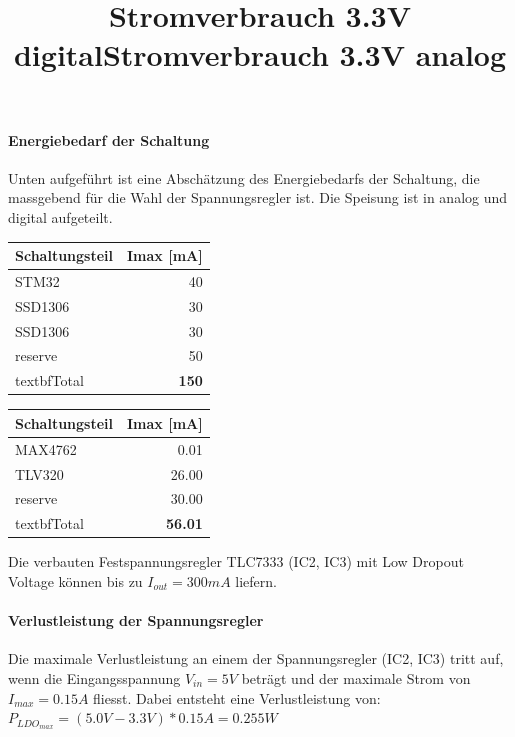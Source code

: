 \paragraph{Energiebedarf der Schaltung}

Unten aufgeführt ist eine Abschätzung des Energiebedarfs der Schaltung, die massgebend für die Wahl der Spannungsregler ist. Die Speisung ist in analog und digital aufgeteilt.

\begin{table}[H]
\title{Stromverbrauch 3.3V digital}
\centering
\begin{tabular}{|l|r|}
\hline
\textbf{Schaltungsteil} & \textbf{Imax {[}\si{mA}{]}} \\ \hline
STM32                   & 40                     \\ \hline
SSD1306                 & 30                     \\ \hline
SSD1306                 & 30                     \\ \hline
reserve                 & 50                     \\ \hline
textbf{Total}           & \textbf{150}            \\ \hline
\end{tabular}
\end{table}

\begin{table}[H]
\title{Stromverbrauch 3.3V analog}
\centering
\begin{tabular}{|l|r|}
\hline
\textbf{Schaltungsteil} & \textbf{Imax {[}\si{mA}{]}} \\ \hline
MAX4762                 & 0.01                   \\ \hline
TLV320                  & 26.00                  \\ \hline
reserve                 & 30.00                  \\ \hline
textbf{Total}           & \textbf{56.01}          \\ \hline
\end{tabular}
\end{table}

Die verbauten Festspannungsregler TLC7333 (IC2, IC3) mit Low Dropout Voltage können bis zu ${I_{out}=300\si{mA}}$ liefern.

\paragraph{Verlustleistung der Spannungsregler}

Die maximale Verlustleistung an einem der Spannungsregler (IC2, IC3) tritt auf, wenn die Eingangsspannung ${V_{in}=5\si{V}}$ beträgt und der maximale Strom von ${I_{max}=0.15\si{A}}$ fliesst.
Dabei entsteht eine Verlustleistung von:\
\
${P_{LDO_{max}}=(5.0\si{V}-3.3\si{V})*0.15\si{A}}=0.255\si{W}$


